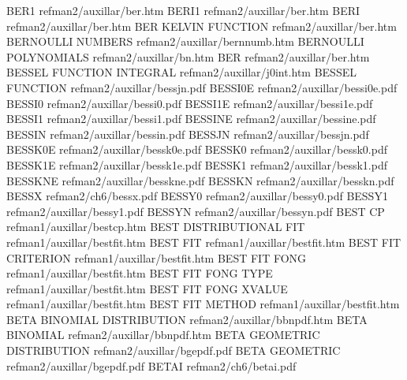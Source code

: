 BER1                                    refman2/auxillar/ber.htm
BERI1                                   refman2/auxillar/ber.htm
BERI                                    refman2/auxillar/ber.htm
BER KELVIN FUNCTION                     refman2/auxillar/ber.htm
BERNOULLI NUMBERS                       refman2/auxillar/bernnumb.htm
BERNOULLI POLYNOMIALS                   refman2/auxillar/bn.htm
BER                                     refman2/auxillar/ber.htm
BESSEL FUNCTION INTEGRAL                refman2/auxillar/j0int.htm
BESSEL FUNCTION                         refman2/auxillar/bessjn.pdf
BESSI0E                                 refman2/auxillar/bessi0e.pdf
BESSI0                                  refman2/auxillar/bessi0.pdf
BESSI1E                                 refman2/auxillar/bessi1e.pdf
BESSI1                                  refman2/auxillar/bessi1.pdf
BESSINE                                 refman2/auxillar/bessine.pdf
BESSIN                                  refman2/auxillar/bessin.pdf
BESSJN                                  refman2/auxillar/bessjn.pdf
BESSK0E                                 refman2/auxillar/bessk0e.pdf
BESSK0                                  refman2/auxillar/bessk0.pdf
BESSK1E                                 refman2/auxillar/bessk1e.pdf
BESSK1                                  refman2/auxillar/bessk1.pdf
BESSKNE                                 refman2/auxillar/besskne.pdf
BESSKN                                  refman2/auxillar/besskn.pdf
BESSX                                   refman2/ch6/bessx.pdf
BESSY0                                  refman2/auxillar/bessy0.pdf
BESSY1                                  refman2/auxillar/bessy1.pdf
BESSYN                                  refman2/auxillar/bessyn.pdf
BEST CP                                 refman1/auxillar/bestcp.htm
BEST DISTRIBUTIONAL FIT                 refman1/auxillar/bestfit.htm
BEST FIT                                refman1/auxillar/bestfit.htm
BEST FIT CRITERION                      refman1/auxillar/bestfit.htm
BEST FIT FONG                           refman1/auxillar/bestfit.htm
BEST FIT FONG TYPE                      refman1/auxillar/bestfit.htm
BEST FIT FONG XVALUE                    refman1/auxillar/bestfit.htm
BEST FIT METHOD                         refman1/auxillar/bestfit.htm
BETA BINOMIAL DISTRIBUTION              refman2/auxillar/bbnpdf.htm
BETA BINOMIAL                           refman2/auxillar/bbnpdf.htm
BETA GEOMETRIC DISTRIBUTION             refman2/auxillar/bgepdf.pdf
BETA GEOMETRIC                          refman2/auxillar/bgepdf.pdf
BETAI                                   refman2/ch6/betai.pdf
